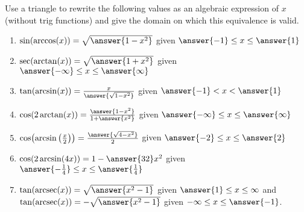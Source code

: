 \documentclass{ximera}
\author{Elizabeth Campolongo}
\begin{document}
\begin{exercise}
Use a triangle to rewrite the following values as an algebraic expression of $x$ (without trig functions) and give the domain on which this equivalence is valid.%
\begin{enumerate}
\item $\sin(\arccos(x)) = \sqrt{\answer{1-x^2}}$ given $\answer{-1} \leq x \leq \answer{1}$
%
\item  $\sec(\arctan(x)) = \sqrt{\answer{1+x^2}}$ given $\answer{-\infty} \leq x \leq \answer{\infty}$
%
\item $\tan(\arcsin(x)) = \frac{x}{\answer{\sqrt{1-x^2}}}$ given $\answer{-1} < x < \answer{1}$
%
\item $\cos(2\arctan(x)) = \frac{\answer{1-x^2}}{1+\answer{x^2}}$ given $\answer{-\infty} \leq x \leq \answer{\infty}$
%
\item $\cos\!\big(\!\arcsin\big(\frac{x}{2}\big)\big) = \frac{\answer{\sqrt{4-x^2}}}{2}$ given $\answer{-2} \leq x \leq \answer{2}$
%
\item $\cos(2\arcsin(4x)) = 1-\answer{32}x^2$ given $\answer{-\frac{1}{4}} \leq x \leq \answer{\frac{1}{4}}$
%
\item $\tan(\arcsec(x)) = \sqrt{\answer{x^2 - 1}}$ given $\answer{1} \leq x \leq \infty$ and \\
$\tan(\arcsec(x)) = -\sqrt{\answer{x^2-1}}$ given $-\infty \leq x \leq \answer{-1}$.
\end{enumerate}
\end{exercise}
\end{document}
